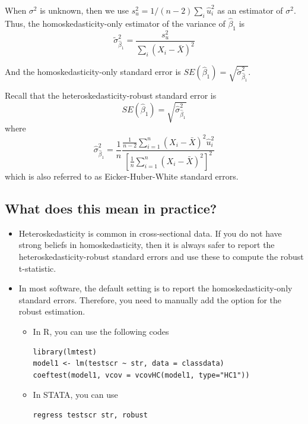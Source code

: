 \documentclass[a4paper,11pt]{article}
\begin{document}
When \(\sigma^2\) is unknown, then we use \(s^2_u = 1/(n-2) \sum_i
\hat{u}_i^2\) as an estimator of \(\sigma^2\). Thus, the
homoskedasticity-only estimator of the variance of \(\hat{\beta}_1\) is
\begin{equation}
\label{eq:vbeta-1b} \tilde{\sigma}^2_{\hat{\beta}_1} =
\frac{s^2_u}{\sum_i (X_i - \bar{X})^2} 
\end{equation} 

And the homoskedasticity-only standard error is \(SE(\hat{\beta}_1) =
\sqrt{\tilde{\sigma}^2_{\hat{\beta}_1}}\).

Recall that the heteroskedasticity-robust standard error is
\begin{equation*}
SE(\hat{\beta}_1) = \sqrt{\hat{\sigma}^2_{\hat{\beta}_1}}
\end{equation*} 
where
\begin{equation*}
\hat{\sigma}^2_{\hat{\beta}_1} = \frac{1}{n} \frac{\frac{1}{n-2}
\sum_{i=1}^n (X_i - \bar{X})^2 \hat{u}^2_i}{\left[ \frac{1}{n}
\sum_{i=1}^n (X_i - \bar{X})^2 \right]^2} 
\end{equation*} 
which is also referred to as Eicker-Huber-White standard errors.


\subsection{What does this mean in practice?}
\label{sec:orged28a68}

\begin{itemize}
\item Heteroskedasticity is common in cross-sectional data. If you do not
have strong beliefs in homoskedasticity, then it is always safer to
report the heteroskedasticity-robust standard errors and use these
to compute the robust t-statistic.
\item In most software, the default setting is to report the
homoskedasticity-only standard errors. Therefore, you need to
manually add the option for the robust estimation. 

\begin{itemize}
\item In R, you can use the following codes
\begin{verbatim}
library(lmtest)
model1 <- lm(testscr ~ str, data = classdata)
coeftest(model1, vcov = vcovHC(model1, type="HC1"))
\end{verbatim}

\item In STATA, you can use
\begin{verbatim}
regress testscr str, robust
\end{verbatim}
\end{itemize}
\end{itemize}
\end{document}
